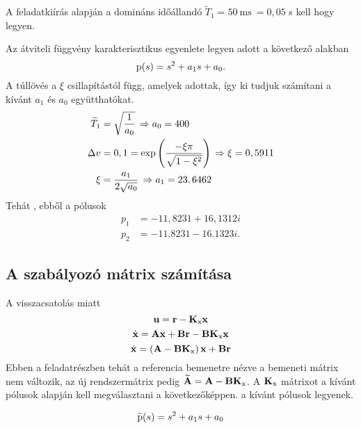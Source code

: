 A feladatkiírás alapján a domináns időállandó $\widetilde{T}_1=50~\text{ms}~=0,05$ s
kell hogy legyen.

Az átviteli függvény karakterisztikus egyenlete legyen adott a következő alakban
\begin{equation}
	\mathrm{p}(s) = s^2 + a_1 s + a_0.
\end{equation}
A túllövés a $\xi$ csillapítástól függ, amelyek adottak, így ki tudjuk számítani a
kívánt $a_1$ és $a_0$ együtthatókat.
\begin{align}
	\widetilde{T}_1 &= \sqrt{\frac{1}{a_0}}\,\Rightarrow a_0 = 400\\
	\Delta v        &= 0,1 = \operatorname{exp}\left(\frac{-\xi\pi}{\sqrt{1-\xi^2}} \right)
	\,\Rightarrow \xi = 0,5911\\
	\xi             &= \frac{a_1}{2\sqrt{a_0}}\,\Rightarrow a_1 = 23,6462
\end{align}
%
Tehát , ebből a pólusok
\begin{align}
	p_1 &= -11,8231 + 16,1312i\\
	p_2 &= -11.8231 - 16.1323i.
\end{align}


\subsection{A szabályozó mátrix számítása}


A visszacsatolás miatt
\begin{equation}
	\boldsymbol{\mathrm{u}} = \boldsymbol{\mathrm{r}} - \boldsymbol{\mathrm{K}}_\text{x}\boldsymbol{\mathrm{x}}
\end{equation}
\begin{equation}
	\dot{\boldsymbol{\mathrm{x}}} = \boldsymbol{\mathrm{A}}\boldsymbol{\mathrm{x}} + \boldsymbol{\mathrm{B}}\boldsymbol{\mathrm{r}} - \boldsymbol{\mathrm{B}}\boldsymbol{\mathrm{K}}_\text{x}\boldsymbol{\mathrm{x}}
\end{equation}
\begin{equation}
	\dot{\boldsymbol{\mathrm{x}}} = \left(\boldsymbol{\mathrm{A}}-\boldsymbol{\mathrm{B}}\boldsymbol{\mathrm{K}}_\text{x}\right)\boldsymbol{\mathrm{x}} + \boldsymbol{\mathrm{B}}\boldsymbol{\mathrm{r}}
\end{equation}
Ebben a feladatrészben  tehát a referencia bemenetre nézve
a bemeneti mátrix nem változik, az új rendszermátrix pedig $\widetilde{\boldsymbol{\mathrm{A}}} = \boldsymbol{\mathrm{A}}-\boldsymbol{\mathrm{B}}\boldsymbol{\mathrm{K}}_\text{x}$.
A $\boldsymbol{\mathrm{K}}_\text{x}$ mátrixot a kívánt pólusok alapján kell megválasztani a következőképpen.
a kívánt pólusok legyenek.

\begin{equation}
	\widetilde{\mathrm{p}}(s) = s^2 + a_1s + a_0
\end{equation}

